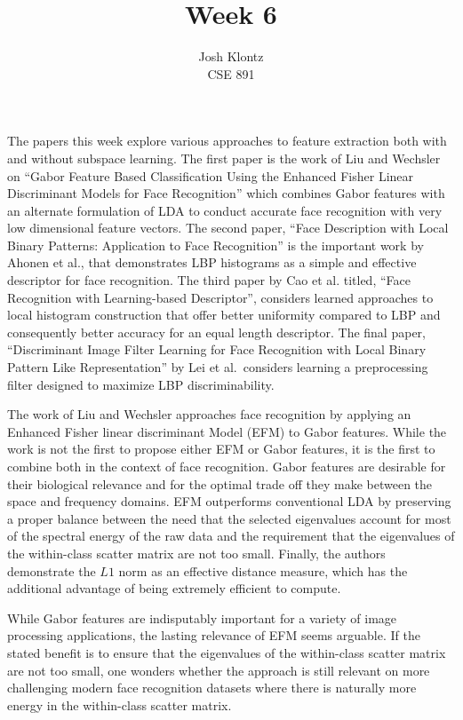 \documentclass[12pt]{article}
\begin{document}
 
\title{Week 6}
\author{Josh Klontz\\CSE 891}
 
\maketitle
 
The papers this week explore various approaches to feature extraction both with and without subspace learning.
The first paper is the work of Liu and Wechsler on ``Gabor Feature Based Classification Using the Enhanced Fisher Linear Discriminant Models for Face Recognition'' which combines Gabor features with an alternate formulation of LDA to conduct accurate face recognition with very low dimensional feature vectors.
The second paper, ``Face Description with Local Binary Patterns: Application to Face Recognition'' is the important work by Ahonen et al., that demonstrates LBP histograms as a simple and effective descriptor for face recognition.
The third paper by Cao et al. titled, ``Face Recognition with Learning-based Descriptor'', considers learned approaches to local histogram construction that offer better uniformity compared to LBP and consequently better accuracy for an equal length descriptor.
The final paper, ``Discriminant Image Filter Learning for Face Recognition with Local Binary Pattern Like Representation'' by Lei et al.\ considers learning a preprocessing filter designed to maximize LBP discriminability.
\par
The work of Liu and Wechsler approaches face recognition by applying an Enhanced Fisher linear discriminant Model (EFM) to Gabor features.
While the work is not the first to propose either EFM or Gabor features, it is the first to combine both in the context of face recognition.
Gabor features are desirable for their biological relevance and for the optimal trade off they make between the space and frequency domains.
EFM outperforms conventional LDA by preserving a proper balance between the need that the selected eigenvalues account for most of the spectral energy of the raw data and the requirement that the eigenvalues of the within-class scatter matrix are not too small.
Finally, the authors demonstrate the $L1$ norm as an effective distance measure, which has the additional advantage of being extremely efficient to compute.
\par
While Gabor features are indisputably important for a variety of image processing applications, the lasting relevance of EFM seems arguable.
If the stated benefit is to ensure that the eigenvalues of the within-class scatter matrix are not too small, one wonders whether the approach is still relevant on more challenging modern face recognition datasets where there is naturally more energy in the within-class scatter matrix.
\end{document}
